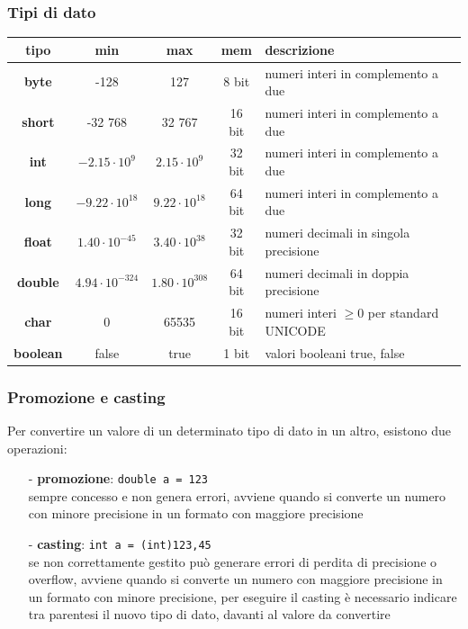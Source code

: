 \documentclass{article}
\begin{document}
\subsubsection*{Tipi di dato}
\begin{center}
	\begin{tabularx}{\textwidth}{c c c c X}
		\textbf{tipo} & \textbf{min} & \textbf{max} & \textbf{mem} & \textbf{descrizione} \\
		\toprule

		\textbf{byte}
		& -128 & 127 & 8 bit & numeri interi in complemento a due \\
		\midrule
		
		\textbf{short}
		& -32 768 & 32 767 & 16 bit & numeri interi in complemento a due \\
		\midrule

		\textbf{int}
		& \(-2.15 \cdot 10^9\) & \(2.15 \cdot 10^9\) & 32 bit & numeri interi in complemento a due \\
		\midrule
		
		\textbf{long}
		& \(-9.22 \cdot 10^{18}\) & \(9.22 \cdot 10^{18}\) & 64 bit & numeri interi in complemento a due \\
		\midrule
		
		\textbf{float}
		& \(1.40 \cdot 10^{-45}\) & \(3.40 \cdot 10^{38}\) & 32 bit & numeri decimali in singola precisione \\
		\midrule
		
		\textbf{double}
		& \(4.94 \cdot 10^{-324}\) & \(1.80 \cdot 10^{308}\) & 64 bit & numeri decimali in doppia precisione \\
		\midrule
		
		\textbf{char}
		& 0 & 65535 & 16 bit & numeri interi \(\geq 0\) per standard UNICODE \\
		\midrule

		\textbf{boolean}
		& false & true & 1 bit & valori booleani true, false
	\end{tabularx}
\end{center}

\subsubsection*{Promozione e casting}
Per convertire un valore di un determinato tipo di dato in un altro, esistono due operazioni:
\begin{itemize}[topsep=3pt, itemsep=0pt]
	\item[-] \textbf{promozione}: \verb|double a = 123| \\
	sempre concesso e non genera errori, avviene quando si converte un numero con minore precisione in un formato con
	maggiore precisione
	\item[-] \textbf{casting}: \verb|int a = (int)123,45| \\
	se non correttamente gestito può generare errori di perdita di precisione o overflow, avviene quando si converte
	un numero con maggiore precisione in un formato con minore precisione, per eseguire il casting è necessario indicare
	tra parentesi il nuovo tipo di dato, davanti al valore da convertire
\end{itemize}
\end{document}
